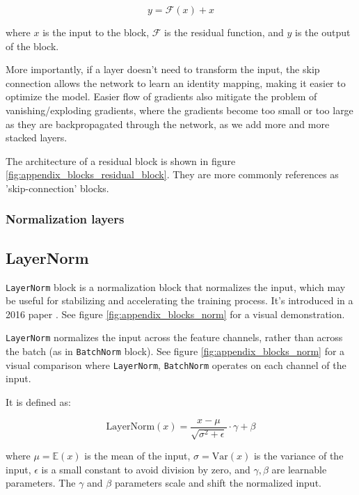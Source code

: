 \begin{equation*}
    y = \mathcal{F} (x) + x
\end{equation*}

where $x$ is the input to the block, $\mathcal{F}$ is the residual function, and $y$ is the output of the block.

More importantly, if a layer doesn't need to transform the input, the skip connection allows the network to learn an identity mapping, making it easier to optimize the model. Easier flow of gradients also mitigate the problem of vanishing/exploding gradients, where the gradients become too small or too large as they are backpropagated through the network, as we add more and more stacked layers.

The architecture of a residual block is shown in figure \ref{fig:appendix_blocks_residual_block}. They are more commonly references as 'skip-connection' blocks.






\subsubsection{Normalization layers}
\label{appendix:blocks_norm}

\subsection*{LayerNorm}

\texttt{LayerNorm} block is a normalization block that normalizes the input, which may be useful for stabilizing and accelerating the training process. It's introduced in a 2016 paper \cite{layernorm}. See figure \ref{fig:appendix_blocks_norm} for a visual demonstration.

\texttt{LayerNorm} normalizes the input across the feature channels, rather than across the batch (as in \texttt{BatchNorm} block). See figure \ref{fig:appendix_blocks_norm} for a visual comparison where \texttt{LayerNorm}, \texttt{BatchNorm} operates on each channel of the input.

It is defined as:

\begin{equation*}
    \text{LayerNorm}(x) = \frac{x - \mu}{\sqrt{\sigma^2 + \epsilon}} \cdot \gamma + \beta
\end{equation*}

where $\mu = \mathbb{E}(x)$ is the mean of the input, $\sigma = \text{Var} (x)$ is the variance of the input, $\epsilon$ is a small constant to avoid division by zero, and $\gamma, \beta$ are learnable parameters. The $\gamma$ and $\beta$ parameters scale and shift the normalized input.


